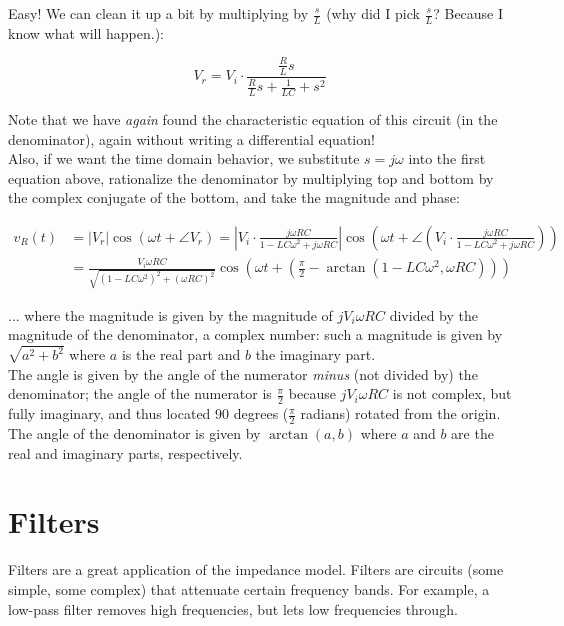 \documentclass[12pt,a4paper]{report}
\begin{document}
Easy! We can clean it up a bit by multiplying by $\displaystyle \frac{s}{L}$ (why did I pick $\displaystyle \frac{s}{L}$? Because I know what will happen.):

\[ V_r = V_i \cdot \frac{\frac{R}{L} s}{ \frac{R}{L} s + \frac{1}{LC} + s^2} \]

Note that we have \emph{again} found the characteristic equation of this circuit (in the denominator), again without writing a differential equation!\\
Also, if we want the time domain behavior, we substitute $s = j\omega$ into the first equation above, rationalize the denominator by multiplying top and bottom by the complex conjugate of the bottom, and take the magnitude and phase:

\begin{align*}
v_R(t) &= |V_r| \cos{(\omega t + \angle V_r)} 
     = 
      \left| V_i \cdot \frac{j\omega RC}{1 - LC \omega^2 + j\omega RC} \right| 
      \cos{(\omega t + 
      \angle \left( V_i \cdot \frac{j\omega RC}{1 - LC \omega^2 + j\omega RC} \right) )} \\
    &= \frac{V_i \omega R C}{\sqrt{(1 - LC\omega^2)^2 + (\omega RC)^2}} \cos{(\omega t + (\frac{\pi}{2} - \arctan{(1 - LC\omega^2, \omega RC)}))}
\end{align*}

... where the magnitude is given by the magnitude of $j V_i \omega R C$ divided by the magnitude of the denominator, a complex number: such a magnitude is given by $\sqrt{a^2 + b^2}$ where $a$ is the real part and $b$ the imaginary part.\\
The angle is given by the angle of the numerator \emph{minus} (not divided by) the denominator; the angle of the numerator is $\displaystyle \frac{\pi}{2}$ because $j V_i \omega R C$ is not complex, but fully imaginary, and thus located 90 degrees ($\displaystyle \frac{\pi}{2}$ radians) rotated from the origin. The angle of the denominator is given by $\arctan{(a, b)}$ where $a$ and $b$ are the real and imaginary parts, respectively.



\newpage
\section{Filters}

Filters are a great application of the impedance model. Filters are circuits (some simple, some complex) that attenuate certain frequency bands. For example, a low-pass filter removes high frequencies, but lets low frequencies through.\\
\end{document}
